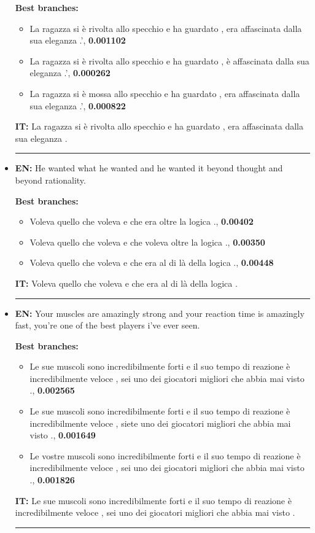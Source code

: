 \begin{itemize}
    \textbf{Best branches:}
    \begin{itemize}
        \item La ragazza si è rivolta allo specchio e ha guardato , era affascinata dalla sua eleganza .', \textbf{0.001102}
        \item La ragazza si è rivolta allo specchio e ha guardato , è affascinata dalla sua eleganza .', \textbf{0.000262}
        \item La ragazza si è mossa allo specchio e ha guardato , era affascinata dalla sua eleganza .', \textbf{0.000822}
    \end{itemize}
    \textbf{IT:} La ragazza si è rivolta allo specchio e ha guardato , era affascinata dalla sua eleganza .\\
    \noindent\rule{14.8cm}{0.4pt}

    \item \textbf{EN:} He wanted what he wanted and he wanted it beyond thought and beyond rationality.
    
    \textbf{Best branches:}
    \begin{itemize}
        \item Voleva quello che voleva e che era oltre la logica ., \textbf{0.00402}
        \item Voleva quello che voleva e che voleva oltre la logica ., \textbf{0.00350}
        \item Voleva quello che voleva e che era al di là della logica ., \textbf{0.00448}
    \end{itemize}
    \textbf{IT:} Voleva quello che voleva e che era al di là della logica .\\
    \noindent\rule{14.8cm}{0.4pt}

    \item \textbf{EN:} Your muscles are amazingly strong and your reaction time is amazingly fast, you're one of the best players i've ever seen.
    
    \textbf{Best branches:}
    \begin{itemize}
        \item Le sue muscoli sono incredibilmente forti e il suo tempo di reazione è incredibilmente veloce , sei uno dei giocatori migliori che abbia mai visto ., \textbf{0.002565}
        \item Le sue muscoli sono incredibilmente forti e il suo tempo di reazione è incredibilmente veloce , siete uno dei giocatori migliori che abbia mai visto ., \textbf{0.001649}
        \item Le vostre muscoli sono incredibilmente forti e il suo tempo di reazione è incredibilmente veloce , sei uno dei giocatori migliori che abbia mai visto ., \textbf{0.001826}
    \end{itemize}
    \textbf{IT:} Le sue muscoli sono incredibilmente forti e il suo tempo di reazione è incredibilmente veloce , sei uno dei giocatori migliori che abbia mai visto .\\
    \noindent\rule{14.8cm}{0.4pt}


\end{itemize}
